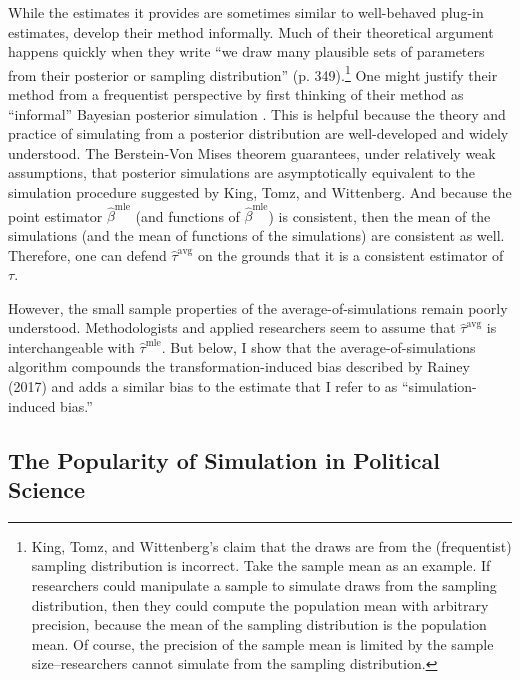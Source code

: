 \documentclass[12pt]{article}
\begin{document}
While the estimates it provides are sometimes similar to well-behaved plug-in estimates, \cite{KingTomzWittenberg2000} develop their method informally. 
Much of their theoretical argument happens quickly when they write ``we draw many plausible sets of parameters from their posterior or sampling distribution'' (p. 349).\footnote{King, Tomz, and Wittenberg's claim that the draws are from the (frequentist) sampling distribution is incorrect. Take the sample mean as an example. If researchers could manipulate a sample to simulate draws from the sampling distribution, then they could compute the population mean with arbitrary precision, because the mean of the sampling distribution is the population mean. Of course, the precision of the sample mean is limited by the sample size--researchers cannot simulate from the sampling distribution.}
One might justify their method from a frequentist perspective by first thinking of their method as ``informal'' Bayesian posterior simulation \citep{GelmanHill2006}.  
This is helpful because the theory and practice of simulating from a posterior distribution are well-developed and widely understood. 
The Berstein-Von Mises theorem \citep[pp.\@ 140-146]{vanderVaart2000} guarantees, under relatively weak assumptions, that posterior simulations are asymptotically equivalent to the simulation procedure suggested by King, Tomz, and Wittenberg. And because the point estimator $\hat{\beta}^{\text{mle}}$ (and functions of $\hat{\beta}^{\text{mle}}$) is consistent, then the mean of the simulations (and the mean of functions of the simulations) are consistent as well. Therefore, one can defend $\hat{\tau}^{\text{avg}}$ on the grounds that it is a consistent estimator of $\tau$. 

However, the small sample properties of the average-of-simulations remain poorly understood. Methodologists and applied researchers seem to assume that $\hat{\tau}^{\text{avg}}$ is interchangeable with  $\hat{\tau}^{\text{mle}}$. 
But below, I show that the average-of-simulations algorithm compounds the transformation-induced bias described by Rainey (2017) and adds a similar bias to the estimate that I refer to as ``simulation-induced bias.'' 

\subsection*{The Popularity of Simulation in Political Science}
\end{document}
